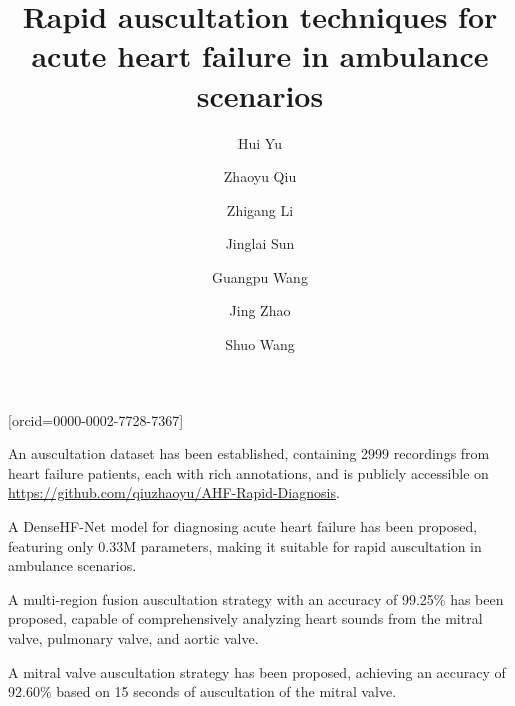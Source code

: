 \documentclass[a4paper,fleqn]{cas-dc}
\begin{document}
\sloppy
\let\WriteBookmarks\relax
\def\floatpagepagefraction{1}
\def\textpagefraction{.001}



\title [mode = title]{Rapid auscultation techniques for acute heart failure in ambulance scenarios}                      

\author[1]{Hui Yu}
\author[1]{Zhaoyu Qiu}[orcid=0000-0002-7728-7367]
\author[2]{Zhigang Li}
\author[1]{Jinglai Sun}
\author[1]{Guangpu Wang}
\author[1]{Jing Zhao}
\cormark[1]
\author[1]{Shuo Wang}
\cormark[1]







\begin{highlights}
    \item An auscultation dataset has been established, containing 2999 recordings from heart failure patients, each with rich annotations, and is publicly accessible on \href{https://github.com/qiuzhaoyu/AHF-Rapid-Diagnosis}{https://github.com/qiuzhaoyu/AHF-Rapid-Diagnosis}.
    \item A DenseHF-Net model for diagnosing acute heart failure has been proposed, featuring only 0.33M parameters, making it suitable for rapid auscultation in ambulance scenarios.
    \item A multi-region fusion auscultation strategy with an accuracy of 99.25\% has been proposed, capable of comprehensively analyzing heart sounds from the mitral valve, pulmonary valve, and aortic valve.
    \item A mitral valve auscultation strategy has been proposed, achieving an accuracy of 92.60\% based on 15 seconds of auscultation of the mitral valve.
    \end{highlights}
    
\end{document}
